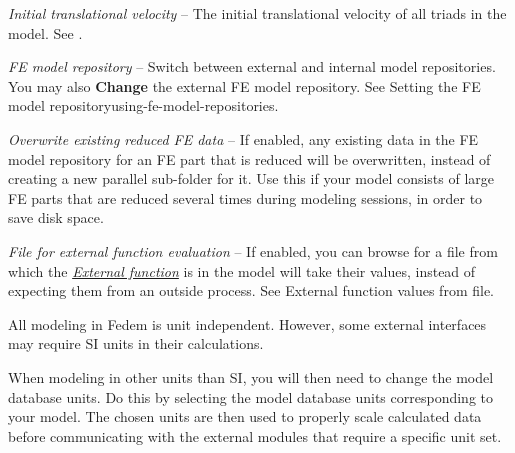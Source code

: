\begin{bulletlist}
  \setcounter{enumi}{4}
\item{\sl Initial translational velocity} --
  The initial translational velocity of all triads in the model. See
  .
\item{\sl FE model repository} --
  Switch between external and internal model repositories.
  You may also \textbf{Change} the external FE model repository. See
                {Setting the FE model repository}{using-fe-model-repositories}.
\item{\sl Overwrite existing reduced FE data} -- If enabled,
  any existing data in the FE model repository for an FE part that is reduced
  will be overwritten, instead of creating a new parallel sub-folder for it.
  Use this if your model consists of large FE parts that are reduced several
  times during modeling sessions, in order to save disk space.
\item{\sl File for external function evaluation} -- If enabled,
  you can browse for a file from which the
  \protect\hyperlink{external-function}{\sl External function} is in the model
  will take their values, instead of expecting them from an outside process.
  See 
  {External function values from file}.
\end{bulletlist}




All modeling in Fedem is unit independent. However, some external interfaces
may require SI units in their calculations.

When modeling in other units than SI, you will then need to change the model
database units. Do this by selecting the model database units corresponding to
your model. The chosen units are then used to properly scale calculated data
before communicating with the external modules that require a specific unit set.



